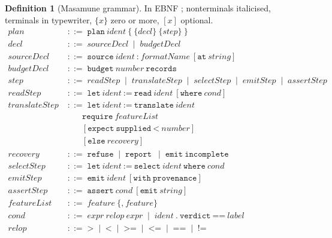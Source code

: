 \documentclass[11pt,twocolumn,a4paper]{article}
\theoremstyle{msthm}
\theoremstyle{definition}
\newtheorem{definition}[theorem]{Definition}
\theoremstyle{remark}
\newcommand{\ms}[1]{\texttt{#1}}
\newcommand{\bnf}{\;::=\;}
\newcommand{\alt}{\;\mid\;}
\begin{document}
\begin{definition}[Masamune grammar]
\label{def:grammar}
In EBNF \citep{ebnf2017}; nonterminals italicised, terminals in
typewriter, $\{x\}$ zero or more, $[x]$ optional.
\begin{align*}
\textit{plan} &\bnf \ms{plan}\ \textit{ident}\ \ms{\{}\
   \{\textit{decl}\}\ \{\textit{step}\}\ \ms{\}}\\[2pt]
\textit{decl} &\bnf \textit{sourceDecl} \alt \textit{budgetDecl}\\
\textit{sourceDecl} &\bnf \ms{source}\ \textit{ident}\ \ms{:}\
   \textit{formatName}\ [\ms{at}\ \textit{string}]\\
\textit{budgetDecl} &\bnf \ms{budget}\ \textit{number}\ \ms{records}\\[2pt]
\textit{step} &\bnf \textit{readStep} \alt \textit{translateStep}
   \alt \textit{selectStep} \alt \textit{emitStep}
   \alt \textit{assertStep}\\[2pt]
\textit{readStep} &\bnf \ms{let}\ \textit{ident}\ \ms{:=}\ \ms{read}\
   \textit{ident}\ [\ms{where}\ \textit{cond}]\\[2pt]
\textit{translateStep} &\bnf \ms{let}\ \textit{ident}\ \ms{:=}\
   \ms{translate}\ \textit{ident}\\
   &\qquad \ms{require}\ \textit{featureList}\\
   &\qquad [\ms{expect}\ \ms{supplied}\ \ms{<}\ \textit{number}]\\
   &\qquad [\ms{else}\ \textit{recovery}]\\[2pt]
\textit{recovery} &\bnf \ms{refuse} \alt \ms{report}\ \alt
   \ms{emit}\ \ms{incomplete}\\[2pt]
\textit{selectStep} &\bnf \ms{let}\ \textit{ident}\ \ms{:=}\
   \ms{select}\ \textit{ident}\ \ms{where}\ \textit{cond}\\[2pt]
\textit{emitStep} &\bnf \ms{emit}\ \textit{ident}\
   [\ms{with}\ \ms{provenance}]\\[2pt]
\textit{assertStep} &\bnf \ms{assert}\ \textit{cond}\
   [\ms{emit}\ \textit{string}]\\[2pt]
\textit{featureList} &\bnf \textit{feature}\ \{\ms{,}\ \textit{feature}\}\\
\textit{cond} &\bnf \textit{expr}\ \textit{relop}\ \textit{expr}
   \alt \textit{ident}\ \ms{.}\ \ms{verdict}\ \ms{==}\ \textit{label}\\
\textit{relop} &\bnf \ms{>} \alt \ms{<} \alt \ms{>=} \alt \ms{<=}
   \alt \ms{==} \alt \ms{!=}
\end{align*}
\end{definition}
\end{document}
